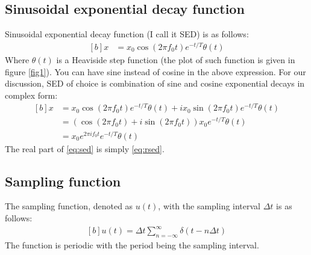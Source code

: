\documentclass[letterpaper, 11pt]{article}
\newcommand{\sed}[2]{#2_{0}e^{2\pi if_{0}#1}e^{-#1/T} \theta (#1)} %
\newcommand{\fsum}[1]{\sum_{#1 = -\infty}^{\infty}} %
\newcommand{\spf}[2]{\Delta #1 \fsum{#2} \delta (#1 - #2 \Delta #1)} %
\numberwithin{equation}{section}
\numberwithin{figure}{section}
\numberwithin{table}{section}
\begin{document}
\subsection{Sinusoidal exponential decay function}
Sinusoidal exponential decay function (I call it SED) is as follows:
\begin{equation}
	\begin{aligned}[b]
		x &= x_{0}\cos{(2\pi f_{0}t)}e^{-t/T} \theta(t)
		\label{eq:rsed}
	\end{aligned}
\end{equation}
Where \(\theta (t)\) is a Heaviside step function (the plot of such function is given in figure \ref{fig1}). You can have sine instead of cosine in the above expression. For our discussion, SED of choice is combination of sine and cosine exponential decays in complex form:
\begin{equation}
	\begin{aligned}[b]
		x	&= x_{0}\cos{(2\pi f_{0}t)}e^{-t/T} \theta(t)+ i x_{0}\sin{(2\pi f_{0}t)}e^{-t/T} \theta(t)\\
			&= (\cos{(2\pi f_{0}t)} +i \sin{(2\pi f_{0}t)})x_{0}e^{-t/T} \theta(t) \\
			&= \sed{t}{x}
			\label{eq:sed}
	\end{aligned}
\end{equation}
The real part of \eqref{eq:sed} is simply \eqref{eq:rsed}.

\subsection{Sampling function}
The sampling function, denoted as \(u(t)\), with the sampling interval \(\Delta t\) is as follows:
\begin{equation}
	\begin{aligned}[b]
		u(t) = \spf{t}{n}
	\end{aligned}
\end{equation}
The function is periodic with the period being the sampling interval. 

\end{document}
